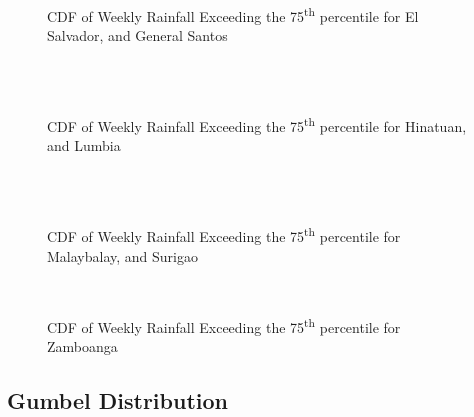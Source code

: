 \begin{figure}[H]
  \centering
  \\
  \\
  \caption{CDF of Weekly Rainfall Exceeding the 75\textsuperscript{th} percentile for El Salvador, and General Santos}
  \label{fig:weekly_0.90_appendix_gpd_pt3}
\end{figure}

\begin{figure}[H]
  \centering
  \\
  \\
  \caption{CDF of Weekly Rainfall Exceeding the 75\textsuperscript{th} percentile for Hinatuan, and Lumbia}
  \label{fig:weekly_0.90_appendix_gpd_pt4}
\end{figure}

\begin{figure}[H]
  \centering
  \\
  \\
  \caption{CDF of Weekly Rainfall Exceeding the 75\textsuperscript{th} percentile for Malaybalay, and Surigao}
  \label{fig:weekly_0.90_appendix_gpd_pt5}
\end{figure}

\begin{figure}[H]
  \centering
  \\
  \caption{CDF of Weekly Rainfall Exceeding the 75\textsuperscript{th} percentile for Zamboanga}
  \label{fig:weekly_0.90_appendix_gpd_pt6}
\end{figure}

\subsection{Gumbel Distribution}

